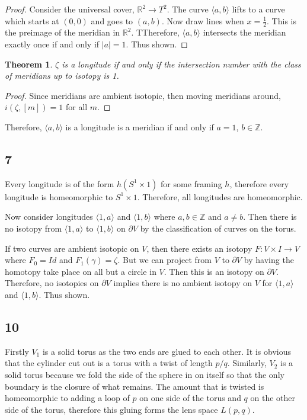 \documentclass{article}
\newtheorem{theorem}{Theorem}
\theoremstyle{definition}
\numberwithin{theorem}{section}
\numberwithin{equation}{section}
\begin{document}
\begin{proof}
    Consider the universal cover, $\mathbb{R}^2 \rightarrow T^2$. The curve $\langle a, b \rangle$ lifts to a curve which starts at $(0,0)$ and goes to $(a, b)$. Now draw lines when $x = \frac{1}{2}$. This is the preimage of the meridian in $\mathbb{R}^2$. TTherefore, $\langle a, b \rangle$ intersects the meridian exactly once if and only if $|a| = 1$. Thus shown. 
\end{proof}

\begin{theorem}
    $\zeta$ is a longitude if and only if the intersection number with the class of meridians up to isotopy is 1. 
\end{theorem}

\begin{proof}
    Since meridians are ambient isotopic, then moving meridians around, $i(\zeta, [m]) = 1$ for all $m$. 
\end{proof}

Therefore, $\langle a, b \rangle$ is a longitude is a meridian if and only if $a = 1$, $b \in \mathbb{Z}$. 

\subsection{7}

Every longitude is of the form $h(S^1 \times 1)$ for some framing $h$, therefore every longitude is homeomorphic to $S^1 \times 1$. Therefore, all longitudes are homeomorphic. 

Now consider longitudes $\langle 1, a \rangle $ and $\langle 1, b \rangle$ where $a, b \in \mathbb{Z}$ and $a \neq b$. Then there is no isotopy from $\langle 1, a \rangle$ to $\langle 1, b \rangle$ on $\partial V$ by the classification of curves on the torus. 

If two curves are ambient isotopic on $V$, then there exists an isotopy $F: V \times I \rightarrow V$ where $F_0 = Id$ and $F_1(\gamma) = \zeta$. But we can project from $V$ to $\partial V$ by having the homotopy take place on all but a circle in $V$. Then this is an isotopy on $\partial V$. Therefore, no isotopies on $\partial V$ implies there is no ambient isotopy on $V$ for $\langle 1, a \rangle$ and $\langle 1, b \rangle$. Thus shown. 

\subsection{10}

Firstly $V_1$ is a solid torus as the two ends are glued to each other. It is obvious that the cylinder cut out is a torus with a twist of length $p/q$. Similarly, $V_2$ is a solid torus because we fold the side of the sphere in on itself so that the only boundary is the closure of what remains. The amount that is twisted is homeomorphic to adding a loop of $p$ on one side of the torus and $q$ on the other side of the torus, therefore this gluing forms the lens space $L(p, q)$. 
\end{document}
